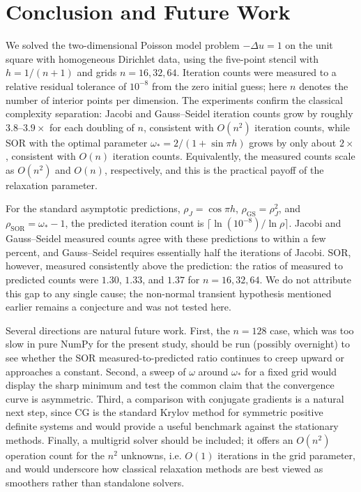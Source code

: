 \documentclass[11pt]{article}
\begin{document}
\section{Conclusion and Future Work}
We solved the two-dimensional Poisson model problem \(-\Delta u = 1\) on the unit square with homogeneous Dirichlet data, using the five-point stencil with \(h = 1/(n+1)\) and grids \(n = 16, 32, 64\). Iteration counts were measured to a relative residual tolerance of \(10^{-8}\) from the zero initial guess; here \(n\) denotes the number of interior points per dimension. The experiments confirm the classical complexity separation: Jacobi and Gauss--Seidel iteration counts grow by roughly \(3.8\)--\(3.9\times\) for each doubling of \(n\), consistent with \(O(n^2)\) iteration counts, while SOR with the optimal parameter \(\omega_* = 2/(1+\sin \pi h)\) grows by only about \(2\times\), consistent with \(O(n)\) iteration counts. Equivalently, the measured counts scale as \(O(n^2)\) and \(O(n)\), respectively, and this is the practical payoff of the relaxation parameter.

For the standard asymptotic predictions, \(\rho_J = \cos \pi h\), \(\rho_{\mathrm{GS}} = \rho_J^2\), and \(\rho_{\mathrm{SOR}} = \omega_* - 1\), the predicted iteration count is \(\lceil \ln(10^{-8}) / \ln \rho \rceil\). Jacobi and Gauss--Seidel measured counts agree with these predictions to within a few percent, and Gauss--Seidel requires essentially half the iterations of Jacobi. SOR, however, measured consistently above the prediction: the ratios of measured to predicted counts were \(1.30\), \(1.33\), and \(1.37\) for \(n = 16, 32, 64\). We do not attribute this gap to any single cause; the non-normal transient hypothesis mentioned earlier remains a conjecture and was not tested here.

Several directions are natural future work. First, the \(n = 128\) case, which was too slow in pure NumPy for the present study, should be run (possibly overnight) to see whether the SOR measured-to-predicted ratio continues to creep upward or approaches a constant. Second, a sweep of \(\omega\) around \(\omega_*\) for a fixed grid would display the sharp minimum and test the common claim that the convergence curve is asymmetric. Third, a comparison with conjugate gradients is a natural next step, since CG is the standard Krylov method for symmetric positive definite systems and would provide a useful benchmark against the stationary methods. Finally, a multigrid solver should be included; it offers an \(O(n^2)\) operation count for the \(n^2\) unknowns, i.e. \(O(1)\) iterations in the grid parameter, and would underscore how classical relaxation methods are best viewed as smoothers rather than standalone solvers.
\printbibliography[title={References}]
\end{document}
